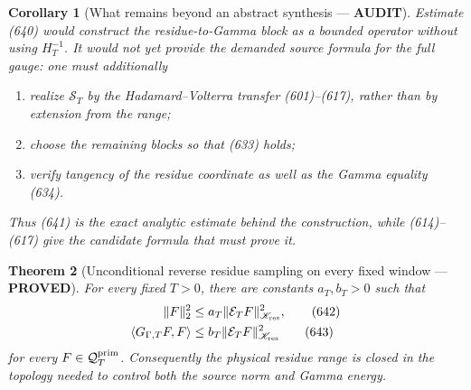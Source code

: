 \documentclass[11pt]{article}
\newtheorem{theorem}{Theorem}
\newtheorem{corollary}[theorem]{Corollary}
\newcommand{\PROVED}{\textcolor{green!45!black}{\textbf{PROVED}}}
\newcommand{\AUDIT}{\textcolor{orange!75!black}{\textbf{AUDIT}}}
\begin{document}
\begin{corollary}[What remains beyond an abstract synthesis ---
\AUDIT]
Estimate (640) would construct the residue-to-Gamma block as a bounded
operator without using \(H_T^{-1}\).  It would not yet provide the demanded
source formula for the full gauge: one must additionally
\begin{enumerate}
\item realize \(\mathscr S_T\) by the Hadamard--Volterra transfer
      (601)--(617), rather than by extension from the range;
\item choose the remaining blocks so that (633) holds;
\item verify tangency of the residue coordinate as well as the Gamma
      equality (634).
\end{enumerate}
Thus (641) is the exact analytic estimate behind the construction, while
(614)--(617) give the candidate formula that must prove it.
\end{corollary}

\begin{theorem}[Unconditional reverse residue sampling on every fixed
window --- \PROVED]
For every fixed \(T>0\), there are constants \(a_T,b_T>0\) such that
\begin{align}
 \|F\|_2^2
 &\le a_T\|\mathcal E_TF\|_{\mathscr K_{\rm res}}^2,
                                                               \tag{642}\\
 \langle G_{\Gamma,T}F,F\rangle
 &\le b_T\|\mathcal E_TF\|_{\mathscr K_{\rm res}}^2             \tag{643}
\end{align}
for every \(F\in\mathcal Q_T^{\rm prim}\).  Consequently the physical
residue range is closed in the topology needed to control both the source
norm and Gamma energy.
\end{theorem}
\end{document}

